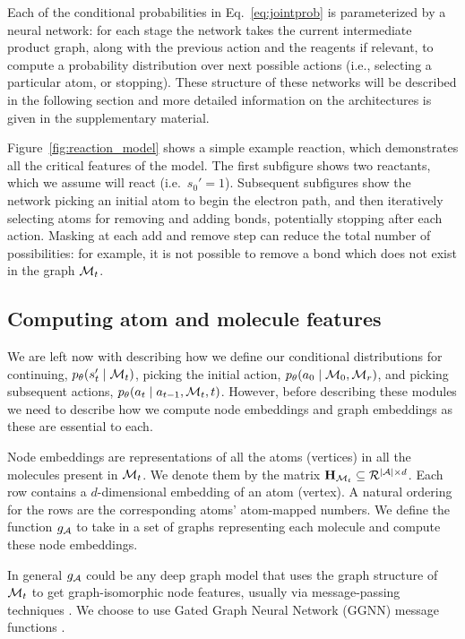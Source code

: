 Each of the conditional probabilities in Eq.~\eqref{eq:jointprob} is parameterized by a neural network:
for each stage the network takes the current intermediate product graph, 
along with the previous action and the reagents if relevant, 
to compute a probability distribution over next possible actions (i.e., selecting a particular atom, or stopping).
These structure of these networks will be described in the following section and more detailed information on the architectures is given in the supplementary material.

Figure~\ref{fig:reaction_model} shows a simple example reaction, which demonstrates all the critical features of the model.
The first subfigure shows two reactants, which we assume will react (i.e.\ $s_0' = 1$).
Subsequent subfigures show the network picking an initial atom to begin the electron path,
and then iteratively selecting atoms for removing and adding bonds, potentially stopping after each action.
Masking at each add and remove step can reduce the total number of possibilities: 
for example, it is not possible to remove a bond which does not exist in the graph ${\mathcal{M}}_t$.

\subsection{Computing atom and molecule features}


We are left now with describing how we define our conditional distributions for continuing, $p_\theta(s'_t \mid {\mathcal{M}}_t)$, picking the initial action, $p_\theta(a_0 \mid {\mathcal{M}}_0, {\mathcal{M}}_r)$, and picking subsequent actions, $p_\theta(a_t \mid a_{t-1}, {\mathcal{M}}_t, t)$.
However, before describing these modules we need to describe how we compute node embeddings and graph embeddings as these  are  essential to each.

Node embeddings are representations of all the atoms (vertices) in all the molecules present in ${\mathcal{M}}_t$.
 We denote them by the matrix ${\mathbf{H}}_{{\mathcal{M}}_t} \subseteq {\mathcal{R}}^{|{\mathcal{A}}|\times d}$.
Each row contains a $d$-dimensional embedding of an atom (vertex).
A natural ordering for the rows are  the corresponding atoms' atom-mapped numbers.
We define the function $g_{{\mathcal{A}}}$ to take in a set of graphs representing each molecule and compute these node embeddings.
 
In general $g_{{\mathcal{A}}}$ could be any deep graph model that uses the graph structure of ${\mathcal{M}}_t$ to get graph-isomorphic node features, usually via message-passing techniques \citep{gilmer2017neural}. 
We choose to use Gated Graph Neural Network (GGNN) message functions \citep{li2016gated}.

